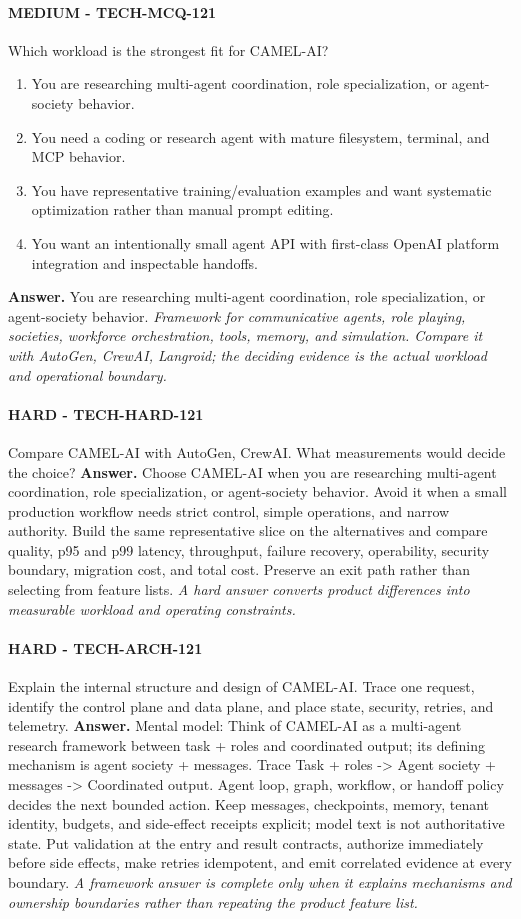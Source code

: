 \paragraph{MEDIUM - TECH-MCQ-121} Which workload is the strongest fit for CAMEL-AI?
\begin{enumerate}[label=\Alph*.]
\item You are researching multi-agent coordination, role specialization, or agent-society behavior.
\item You need a coding or research agent with mature filesystem, terminal, and MCP behavior.
\item You have representative training/evaluation examples and want systematic optimization rather than manual prompt editing.
\item You want an intentionally small agent API with first-class OpenAI platform integration and inspectable handoffs.
\end{enumerate}
\textbf{Answer.} You are researching multi-agent coordination, role specialization, or agent-society behavior.
\textit{Framework for communicative agents, role playing, societies, workforce orchestration, tools, memory, and simulation. Compare it with AutoGen, CrewAI, Langroid; the deciding evidence is the actual workload and operational boundary.}
\paragraph{HARD - TECH-HARD-121} Compare CAMEL-AI with AutoGen, CrewAI. What measurements would decide the choice?
\textbf{Answer.} Choose CAMEL-AI when you are researching multi-agent coordination, role specialization, or agent-society behavior. Avoid it when a small production workflow needs strict control, simple operations, and narrow authority. Build the same representative slice on the alternatives and compare quality, p95 and p99 latency, throughput, failure recovery, operability, security boundary, migration cost, and total cost. Preserve an exit path rather than selecting from feature lists.
\textit{A hard answer converts product differences into measurable workload and operating constraints.}
\paragraph{HARD - TECH-ARCH-121} Explain the internal structure and design of CAMEL-AI. Trace one request, identify the control plane and data plane, and place state, security, retries, and telemetry.
\textbf{Answer.} Mental model: Think of CAMEL-AI as a multi-agent research framework between task + roles and coordinated output; its defining mechanism is agent society + messages. Trace Task + roles -> Agent society + messages -> Coordinated output. Agent loop, graph, workflow, or handoff policy decides the next bounded action. Keep messages, checkpoints, memory, tenant identity, budgets, and side-effect receipts explicit; model text is not authoritative state. Put validation at the entry and result contracts, authorize immediately before side effects, make retries idempotent, and emit correlated evidence at every boundary.
\textit{A framework answer is complete only when it explains mechanisms and ownership boundaries rather than repeating the product feature list.}
